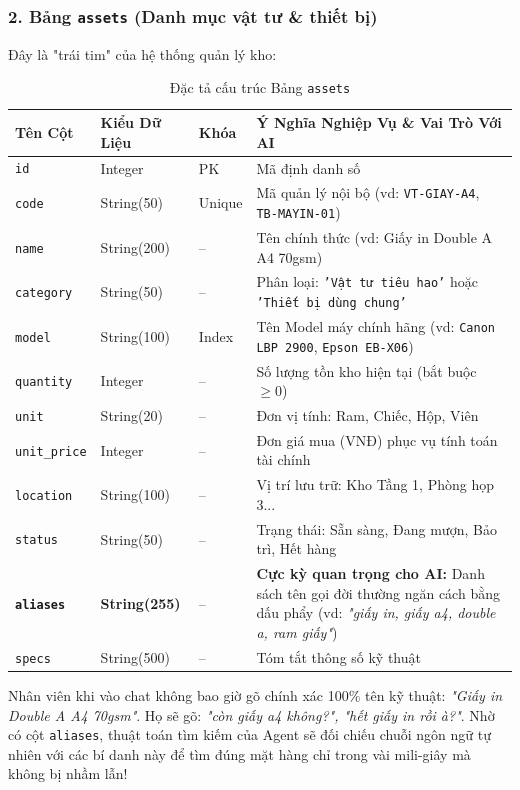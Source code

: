 \documentclass[11pt,a4paper]{article}
\begin{document}
\subsubsection{2. Bảng \texttt{assets} (Danh mục vật tư \& thiết bị)}
Đây là "trái tim" của hệ thống quản lý kho:
\begin{table}[H]
\centering
\small
\begin{tabularx}{\textwidth}{l l l X}
\toprule
\textbf{Tên Cột} & \textbf{Kiểu Dữ Liệu} & \textbf{Khóa} & \textbf{Ý Nghĩa Nghiệp Vụ \& Vai Trò Với AI} \\
\midrule
\texttt{id} & Integer & PK & Mã định danh số \\
\texttt{code} & String(50) & Unique & Mã quản lý nội bộ (vd: \texttt{VT-GIAY-A4}, \texttt{TB-MAYIN-01}) \\
\texttt{name} & String(200) & -- & Tên chính thức (vd: Giấy in Double A A4 70gsm) \\
\texttt{category} & String(50) & -- & Phân loại: \texttt{'Vật tư tiêu hao'} hoặc \texttt{'Thiết bị dùng chung'} \\
\texttt{model} & String(100) & Index & Tên Model máy chính hãng (vd: \texttt{Canon LBP 2900}, \texttt{Epson EB-X06}) \\
\texttt{quantity} & Integer & -- & Số lượng tồn kho hiện tại (bắt buộc $\ge 0$) \\
\texttt{unit} & String(20) & -- & Đơn vị tính: Ram, Chiếc, Hộp, Viên \\
\texttt{unit\_price} & Integer & -- & Đơn giá mua (VNĐ) phục vụ tính toán tài chính \\
\texttt{location} & String(100) & -- & Vị trí lưu trữ: Kho Tầng 1, Phòng họp 3... \\
\texttt{status} & String(50) & -- & Trạng thái: Sẵn sàng, Đang mượn, Bảo trì, Hết hàng \\
\textbf{\texttt{aliases}} & \textbf{String(255)} & -- & \textbf{Cực kỳ quan trọng cho AI:} Danh sách tên gọi đời thường ngăn cách bằng dấu phẩy (vd: \textit{"giấy in, giấy a4, double a, ram giấy"}) \\
\texttt{specs} & String(500) & -- & Tóm tắt thông số kỹ thuật \\
\bottomrule
\end{tabularx}
\caption{Đặc tả cấu trúc Bảng \texttt{assets}}
\end{table}

\begin{notebox}
Nhân viên khi vào chat không bao giờ gõ chính xác 100\% tên kỹ thuật: \textit{"Giấy in Double A A4 70gsm"}. Họ sẽ gõ: \textit{"còn giấy a4 không?", "hết giấy in rồi à?"}. Nhờ có cột \texttt{aliases}, thuật toán tìm kiếm của Agent sẽ đối chiếu chuỗi ngôn ngữ tự nhiên với các bí danh này để tìm đúng mặt hàng chỉ trong vài mili-giây mà không bị nhầm lẫn!
\end{notebox}
\end{document}
